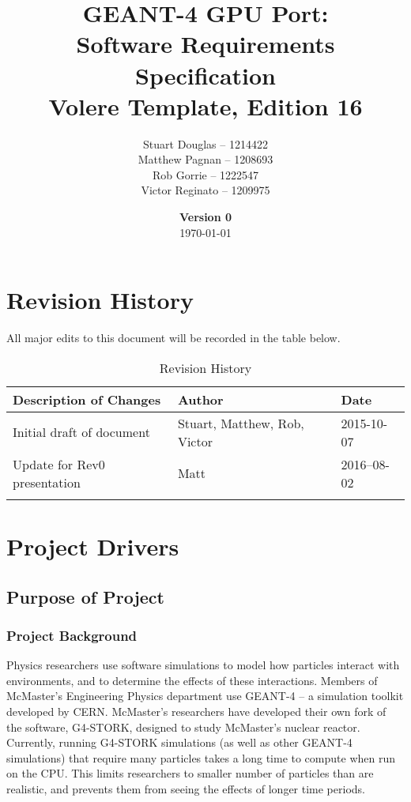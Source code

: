 \documentclass[12pt]{article}
\title{
\LARGE GEANT-4 GPU Port:
\\\vspace{10mm}
\large \textbf{Software Requirements Specification}
\\Volere Template, Edition 16
\vspace{40mm}
}
\author{
Stuart Douglas -- 1214422
\\Matthew Pagnan -- 1208693
\\Rob Gorrie -- 1222547
\\Victor Reginato -- 1209975
\vspace{10mm}
}
\date{\vfill \textbf{Version 0}\\ \today}
\begin{document}

\maketitle
\newpage

\tableofcontents
\newpage
{}
\restoregeometry

\section{Revision History}
All major edits to this document will be recorded in the table below.

\begin{table}[h]
\centering
\caption{Revision History}
\begin{tabular}{|l|l|l|}
\Xhline{2\arrayrulewidth}
\bf Description of Changes & \bf Author & \bf Date\\\hline
Initial draft of document & Stuart, Matthew, Rob, Victor & 2015-10-07\\
Update for Rev0 presentation & Matt & 2016--08-02\\
\Xhline{2\arrayrulewidth}
\end{tabular}
\end{table}

\section{Project Drivers}

\subsection{Purpose of Project} %
\subsubsection{Project Background}
Physics researchers use software simulations to model how particles interact with environments, and to determine the effects of these interactions. Members of McMaster's Engineering Physics department use GEANT-4 -- a simulation toolkit developed by CERN. McMaster's researchers have developed their own fork of the software, G4-STORK, designed to study McMaster's nuclear reactor. Currently, running G4-STORK simulations (as well as other GEANT-4 simulations) that require many particles takes a long time to compute when run on the CPU. This limits researchers to smaller number of particles than are realistic, and prevents them from seeing the effects of longer time periods.
\end{document}
